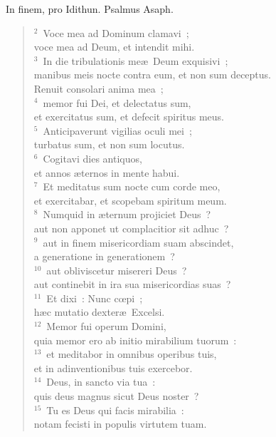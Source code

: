 \bchapter
\lettrine[lines=3,image=true,loversize=0.05,lraise=-0.03]{I}{}n finem, pro Idithun. Psalmus Asaph.
\begin{flushleft}\begin{verse}\vspace{6pt}${}^{2}$~Voce mea ad Dominum clamavi~;\\ voce mea ad Deum, et intendit mihi.\\
${}^{3}$~In die tribulationis me\ae\ Deum exquisivi~;\\ manibus meis nocte contra eum, et non sum deceptus.\\ Renuit consolari anima mea~;\\
${}^{4}$~memor fui Dei, et delectatus sum,\\ et exercitatus sum, et defecit spiritus meus.\\
${}^{5}$~Anticipaverunt vigilias oculi mei~;\\ turbatus sum, et non sum locutus.\\
${}^{6}$~Cogitavi dies antiquos,\\ et annos \ae ternos in mente habui.\\
${}^{7}$~Et meditatus sum nocte cum corde meo,\\ et exercitabar, et scopebam spiritum meum.\\
${}^{8}$~Numquid in \ae ternum projiciet Deus~?\\ aut non apponet ut complacitior sit adhuc~?\\
${}^{9}$~aut in finem misericordiam suam abscindet,\\ a generatione in generationem~?\\
${}^{10}$~aut obliviscetur misereri Deus~?\\ aut continebit in ira sua misericordias suas~?\\
${}^{11}$~Et dixi~: Nunc cœpi~;\\ h\ae c mutatio dexter\ae\ Excelsi.\\
${}^{12}$~Memor fui operum Domini,\\ quia memor ero ab initio mirabilium tuorum~:\\
${}^{13}$~et meditabor in omnibus operibus tuis,\\ et in adinventionibus tuis exercebor.\\
${}^{14}$~Deus, in sancto via tua~:\\ quis deus magnus sicut Deus noster~?\\
${}^{15}$~Tu es Deus qui facis mirabilia~:\\ notam fecisti in populis virtutem tuam.\\

\end{verse}
\end{flushleft}
